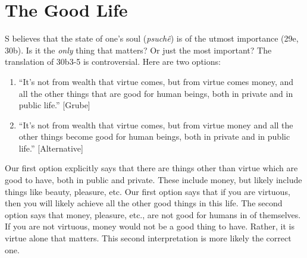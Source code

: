 \documentclass[oneside]{article}
\begin{document}

\section*{The Good Life}

S believes that the state of one's soul (\emph{psuch\^{e}}) is of the utmost importance (29e, 30b). Is it the \emph{only} thing that matters? Or just the most important? The translation of 30b3-5 is controversial. Here are two options:
\begin{enumerate}
\item ``It's not from wealth that virtue comes, but from virtue comes money, and all the other things that are good for human beings, both in private and in public life.'' [Grube]
\item  ``It's not from wealth that virtue comes, but from virtue money and all the other things become good for human beings, both in private and in public life.'' [Alternative]
\end{enumerate}
Our first option explicitly says that there are things other than virtue which are good to have, both in public and private. These include money, but likely include things like beauty, pleasure, etc. Our first option says that if you are virtuous, then you will likely achieve all the other good things in this life. The second option says that money, pleasure, etc., are not good for humans in of themselves. If you are not virtuous, money would not be a good thing to have. Rather, it is virtue alone that matters. This second interpretation is more likely the correct one.
\end{document}
